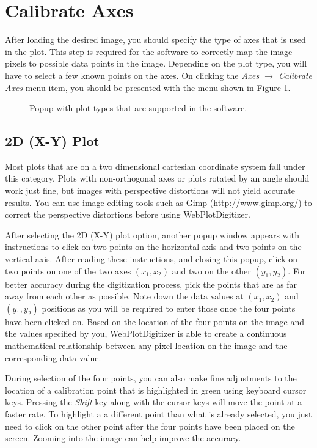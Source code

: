 \documentclass[letterpaper, 10pt]{article}
\begin{document}
\section{Calibrate Axes}

After loading the desired image, you should specify the type of axes that is used in the plot. This step is required for the software to correctly map the image pixels to possible data points in the image. Depending on the plot type, you will have to select a few known points on the axes. On clicking the \emph{Axes $\rightarrow$ Calibrate Axes} menu item, you should be presented with the menu shown in Figure \ref{fig:defineAxesPopup}.
\begin{figure}
\begin{center}
\caption{Popup with plot types that are supported in the software.}
\label{fig:defineAxesPopup}
\end{center}
\end{figure}

\subsection{2D (X-Y) Plot}
Most plots that are on a two dimensional cartesian coordinate system fall under this category. Plots with non-orthogonal axes or plots rotated by an angle should work just fine, but images with perspective distortions will not yield accurate results. You can use image editing tools such as Gimp (\url{http://www.gimp.org/}) to correct the perspective distortions before using WebPlotDigitizer.

After selecting the 2D (X-Y) plot option, another popup window appears with instructions to click on two points on the horizontal axis and two points on the vertical axis. After reading these instructions, and closing this popup, click on two points on one of the two axes $(x_1, x_2)$ and two on the other $(y_1, y_2)$. For better accuracy during the digitization process, pick the points that are as far away from each other as possible. Note down the data values at $(x_1, x_2)$ and $(y_1, y_2)$ positions as you will be required to enter those once the four points have been clicked on. Based on the location of the four points on the image and the values specified by you, WebPlotDigitizer is able to create a continuous mathematical relationship between any pixel location on the image and the corresponding data value.

During selection of the four points, you can also make fine adjustments to the location of a calibration point that is highlighted in green using keyboard cursor keys. Pressing the \emph{Shift}-key along with the cursor keys will move the point at a faster rate. To highlight a a different point than what is already selected, you just need to click on the other point after the four points have been placed on the screen. Zooming into the image can help improve the accuracy.
\end{document}
